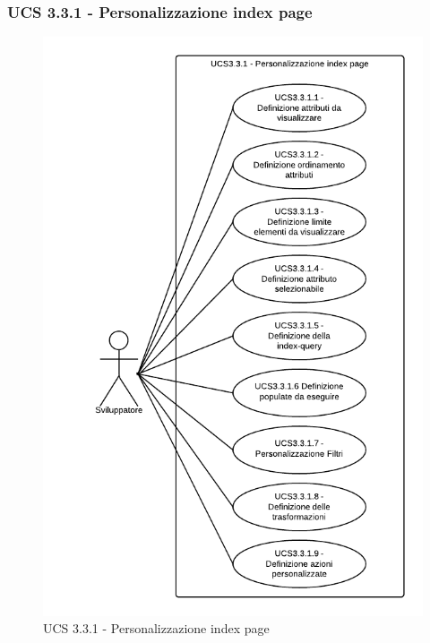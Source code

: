 \subsubsection{UCS 3.3.1 - Personalizzazione index page} 
    \begin{figure}[H]
      \begin{center}
      \includegraphics[width=12cm]{UML/UCS 3.3.1 - Personalizzazione index page.png}
      \caption{UCS 3.3.1 - Personalizzazione index page}
      \end{center} 
    \end{figure}  
    
